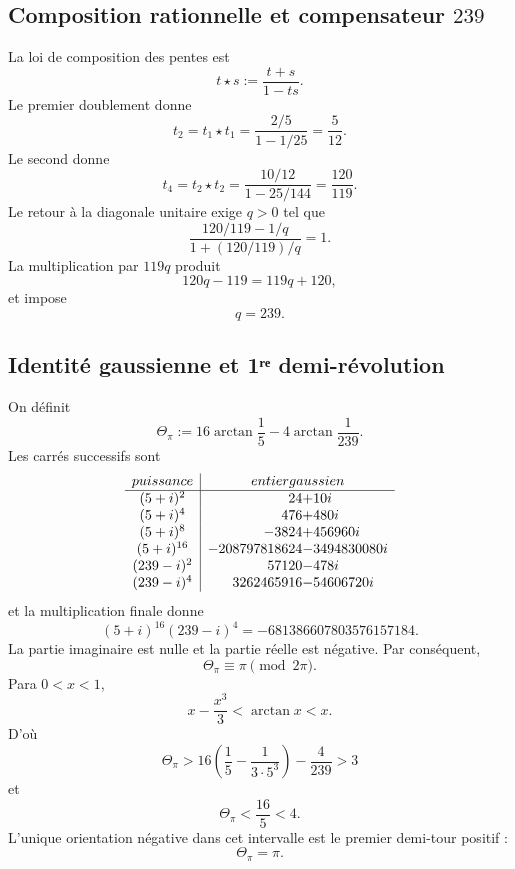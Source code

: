 \subsection{Composition rationnelle et compensateur \texorpdfstring{\(239\)}{239}}

La loi de composition des pentes est
\[
 t\star s:=\frac{t+s}{1-ts}.
\]
Le premier doublement donne
\[
 t_2=t_1\star t_1
 =\frac{2/5}{1-1/25}
 =\frac5{12}.
\]
Le second donne
\[
 t_4=t_2\star t_2
 =\frac{10/12}{1-25/144}
 =\frac{120}{119}.
\]
Le retour à la diagonale unitaire exige \(q>0\) tel que
\[
 \frac{120/119-1/q}{1+(120/119)/q}=1.
\]
La multiplication par \(119q\) produit
\[
 120q-119=119q+120,
\]
et impose
\begin{equation}
 \boxed{q=239.}
 \label{p12-83-c9-s1:eq:compensador-239-pi}
\end{equation}

\subsection{Identité gaussienne et 1ʳᵉ demi-révolution}

On définit
\begin{equation}
 \Theta_\pi
 :=16\arctan\frac15-4\arctan\frac1{239}.
 \label{p12-83-c9-s1:eq:theta-pi-autonoma}
\end{equation}
Les carrés successifs sont
\[
\begin{array}{c|r@{}l}
\text{puissance}&\multicolumn{2}{c}{\text{entier gaussien}}\\ \hline
(5+i)^2&24&+10i\\
(5+i)^4&476&+480i\\
(5+i)^8&-3824&+456960i\\
(5+i)^{16}&-208797818624&-3494830080i\\
(239-i)^2&57120&-478i\\
(239-i)^4&3262465916&-54606720i
\end{array}
\]
et la multiplication finale donne
\begin{equation}
 \boxed{
 (5+i)^{16}(239-i)^4
 =-681386607803576157184.}
 \label{p12-83-c9-s1:eq:identidad-gaussiana-pi-autonoma}
\end{equation}
La partie imaginaire est nulle et la partie réelle est négative. Par conséquent,
\[
 \Theta_\pi\equiv\pi\pmod{2\pi}.
\]
Para \(0<x<1\),
\[
 x-\frac{x^3}{3}<\arctan x<x.
\]
D’où
\[
 \Theta_\pi>
 16\left(\frac15-\frac1{3\cdot5^3}\right)-\frac4{239}>3
\]
et
\[
 \Theta_\pi<\frac{16}{5}<4.
\]
L’unique orientation négative dans cet intervalle est le premier demi-tour
positif :
\begin{equation}
 \boxed{\Theta_\pi=\pi.}
 \label{p12-83-c9-s1:eq:reconocimiento-pi-exacto}
\end{equation}

